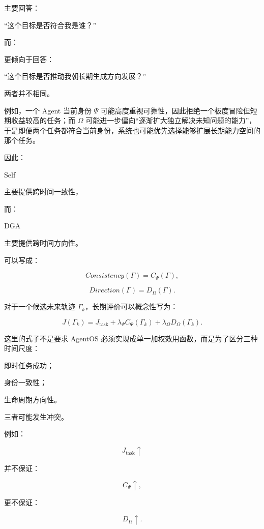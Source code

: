 主要回答：

“这个目标是否符合我是谁？”

而：

\begin{statementbox}
\centering
{}
\end{statementbox}

更倾向于回答：

“这个目标是否推动我朝长期生成方向发展？”

两者并不相同。

例如，一个 Agent 当前身份 $\Psi$ 可能高度重视可靠性，因此拒绝一个极度冒险但短期收益较高的任务；而 $\Omega$ 可能进一步偏向“逐渐扩大独立解决未知问题的能力”，于是即便两个任务都符合当前身份，系统也可能优先选择能够扩展长期能力空间的那个任务。

因此：

\begin{statementbox}
Self
\end{statementbox}

主要提供跨时间一致性，

而：

\begin{statementbox}
DGA
\end{statementbox}

主要提供跨时间方向性。

可以写成：

\[
Consistency(\Gamma)
=
C_{\Psi}(\Gamma),
\]

\[
Direction(\Gamma)
=
D_{\Omega}(\Gamma).
\]

对于一个候选未来轨迹 $\Gamma_k$，长期评价可以概念性写为：

\[
J(\Gamma_k)
=
J_{\mathrm{task}}
+
\lambda_{\Psi}C_{\Psi}(\Gamma_k)
+
\lambda_{\Omega}D_{\Omega}(\Gamma_k).
\]

这里的式子不是要求 AgentOS 必须实现成单一加权效用函数，而是为了区分三种时间尺度：

即时任务成功；

身份一致性；

生命周期方向性。

三者可能发生冲突。

例如：

\[
J_{\mathrm{task}}\uparrow
\]

并不保证：

\[
C_{\Psi}\uparrow,
\]

更不保证：

\[
D_{\Omega}\uparrow.
\]

